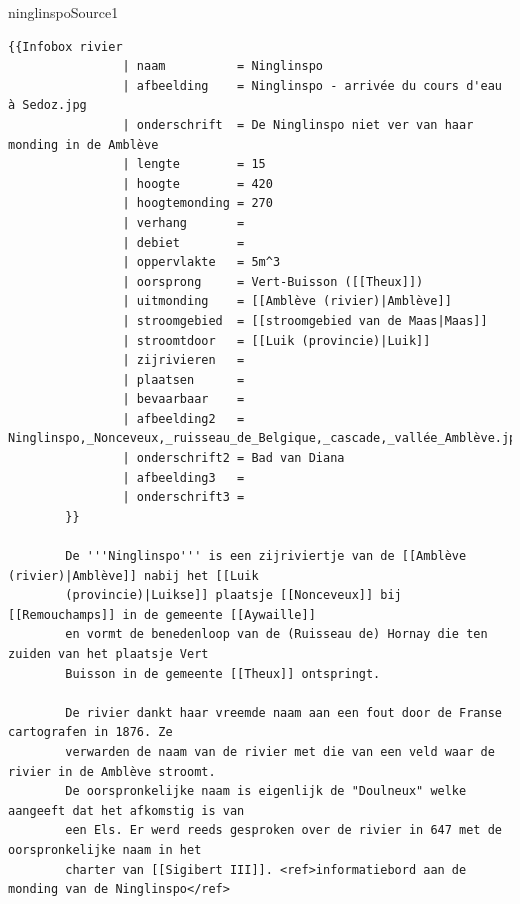 \documentclass[../presentatie.tex]{subfiles}
\begin{document}
    \begin{saveblock}{ninglinspoSource1}
        \begin{Verbatim}[tabsize=4,gobble=8]
        {{Infobox rivier
                | naam          = Ninglinspo
                | afbeelding    = Ninglinspo - arrivée du cours d'eau à Sedoz.jpg
                | onderschrift  = De Ninglinspo niet ver van haar monding in de Amblève
                | lengte        = 15
                | hoogte        = 420
                | hoogtemonding = 270
                | verhang       = 
                | debiet        = 
                | oppervlakte   = 5m^3
                | oorsprong     = Vert-Buisson ([[Theux]])
                | uitmonding    = [[Amblève (rivier)|Amblève]]
                | stroomgebied  = [[stroomgebied van de Maas|Maas]]
                | stroomtdoor   = [[Luik (provincie)|Luik]]
                | zijrivieren   = 
                | plaatsen      = 
                | bevaarbaar    = 
                | afbeelding2   = Ninglinspo,_Nonceveux,_ruisseau_de_Belgique,_cascade,_vallée_Amblève.jpg
                | onderschrift2 = Bad van Diana
                | afbeelding3   = 
                | onderschrift3 = 
        }}

        De '''Ninglinspo''' is een zijriviertje van de [[Amblève (rivier)|Amblève]] nabij het [[Luik
        (provincie)|Luikse]] plaatsje [[Nonceveux]] bij [[Remouchamps]] in de gemeente [[Aywaille]]
        en vormt de benedenloop van de (Ruisseau de) Hornay die ten zuiden van het plaatsje Vert
        Buisson in de gemeente [[Theux]] ontspringt.
        
        De rivier dankt haar vreemde naam aan een fout door de Franse cartografen in 1876. Ze
        verwarden de naam van de rivier met die van een veld waar de rivier in de Amblève stroomt.
        De oorspronkelijke naam is eigenlijk de "Doulneux" welke aangeeft dat het afkomstig is van
        een Els. Er werd reeds gesproken over de rivier in 647 met de oorspronkelijke naam in het
        charter van [[Sigibert III]]. <ref>informatiebord aan de monding van de Ninglinspo</ref>
        \end{Verbatim}
    \end{saveblock}
\end{document}
